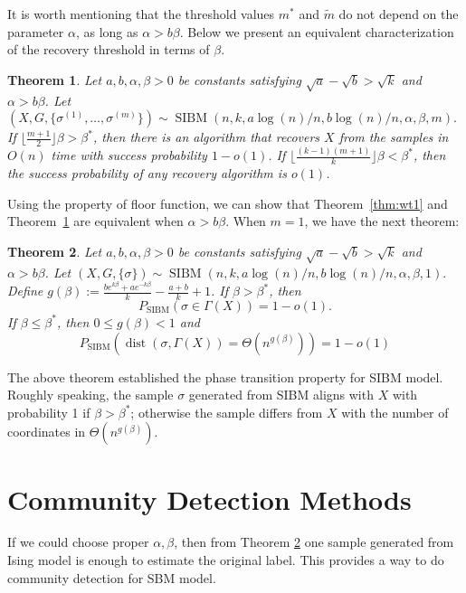 \label{key}\documentclass[conference]{IEEEtran}
\newtheorem{theorem}{Theorem}%
\DeclareMathOperator{\SIBM}{SIBM}
\DeclareMathOperator{\dist}{dist}
\begin{document}
It is worth mentioning that the threshold values $m^\ast$ and $\tilde{m}$ do not depend on the parameter $\alpha$, as long as $\alpha>b\beta$.
Below we present an equivalent characterization of the recovery threshold in terms of $\beta$.
\begin{theorem} \label{thm:wt2}
	Let $a,b,\alpha,\beta> 0$ be constants satisfying $\sqrt{a}-\sqrt{b} > \sqrt{k}$ and $\alpha>b\beta$. 
	Let 
	$
	(X,G,\{\sigma^{(1)},\dots,\sigma^{(m)}\}) \sim \SIBM(n, k, a\log(n)/n, b\log(n)/n,\alpha,\beta,m).
	$
	If $\lfloor \frac{m+1}{2} \rfloor \beta>\beta^\ast$, then there is an algorithm that recovers $X$ from the samples in $O(n)$ time with success probability $1-o(1)$. If $\lfloor \frac{(k-1)(m+1)}{k} \rfloor \beta <\beta^\ast$, then the success probability of any recovery algorithm is $o(1)$. 
\end{theorem}
Using the property of floor function, we can show that Theorem~\ref{thm:wt1} and Theorem~\ref{thm:wt2} are equivalent when $\alpha > b \beta$.
When $m=1$, we have the next theorem:

\begin{theorem}  \label{thm:wt3}
Let $a,b,\alpha,\beta> 0$ be constants satisfying $\sqrt{a}-\sqrt{b} > \sqrt{k}$ and $\alpha>b\beta$.
Let 
$
(X,G,\{\sigma\}) \sim \SIBM(n,k, a\log(n)/n, b\log(n)/n,\alpha,\beta,1).
$
Define $g(\beta)  := \frac{b e^{k\beta}+a e^{-k\beta}}{k}-\frac{a+b}{k}+1$.
If $\beta>\beta^\ast$, then
$$
P_{\SIBM}(\sigma \in \Gamma(X)) = 1-o(1).
$$
If $\beta\le \beta^\ast$, then $0\leq g(\beta) < 1$ and
$$
P_{\SIBM}(\dist(\sigma, \Gamma(X))= \Theta(n^{g(\beta)})) = 1-o(1)
$$
\end{theorem}

The above theorem established the phase transition property for SIBM model.
Roughly speaking, the sample $\sigma$ generated from SIBM aligns with $X$ with probability 1 if $\beta > \beta^*$;
otherwise the sample differs from $X$ with the number of coordinates in $\Theta(n^{g(\beta)})$.
\section{Community Detection Methods}

If we could choose proper $\alpha, \beta$, then from Theorem \ref{thm:wt3} one sample generated from Ising model is enough to
estimate the original label. This provides a way to do community detection for SBM model.
\end{document}
